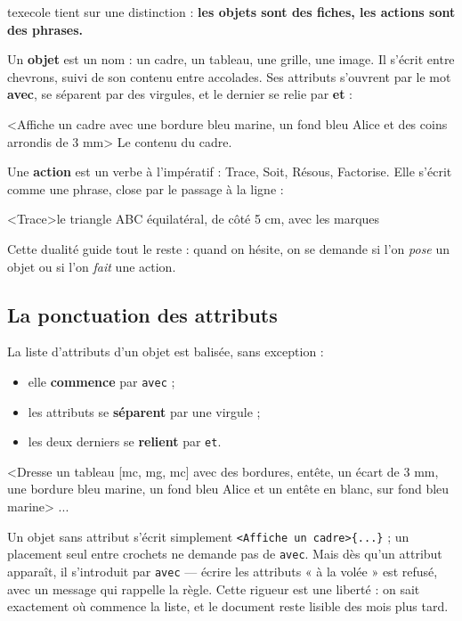 \documentclass[11pt,a4paper]{article}
\newcommand{\bal}[1]{\texttt{#1}}
\begin{document}
texecole tient sur une distinction : \textbf{les objets sont des
fiches, les actions sont des phrases.}

Un \textbf{objet} est un nom : un cadre, un tableau, une grille, une
image. Il s'écrit entre chevrons, suivi de son contenu entre
accolades. Ses attributs s'ouvrent par le mot \textbf{avec}, se
séparent par des virgules, et le dernier se relie par \textbf{et} :

\begin{code}
<Affiche un cadre avec une bordure bleu marine, un fond bleu Alice
       et des coins arrondis de 3 mm>{
    Le contenu du cadre.
}
\end{code}

Une \textbf{action} est un verbe à l'impératif : Trace, Soit, Résous,
Factorise. Elle s'écrit comme une phrase, close par le passage à la
ligne :

\begin{code}
<Trace>le triangle ABC équilatéral, de côté 5 cm, avec les marques
\end{code}

Cette dualité guide tout le reste : quand on hésite, on se demande si
l'on \emph{pose} un objet ou si l'on \emph{fait} une action.

\subsection{La ponctuation des attributs}

La liste d'attributs d'un objet est balisée, sans exception :

\begin{itemize}[nosep]
\item elle \textbf{commence} par \bal{avec} ;
\item les attributs se \textbf{séparent} par une virgule ;
\item les deux derniers se \textbf{relient} par \bal{et}.
\end{itemize}

\begin{code}
<Dresse un tableau [mc, mg, mc] avec des bordures, entête, un écart de 3 mm,
    une bordure bleu marine, un fond bleu Alice
    et un entête en blanc, sur fond bleu marine>{ ... }
\end{code}

Un objet sans attribut s'écrit simplement \bal{<Affiche un cadre>\{...\}} ; un
placement seul entre crochets ne demande pas de \bal{avec}. Mais dès
qu'un attribut apparaît, il s'introduit par \bal{avec} — écrire les
attributs « à la volée » est refusé, avec un message qui rappelle la
règle. Cette rigueur est une liberté : on sait exactement où commence
la liste, et le document reste lisible des mois plus tard.
\end{document}
